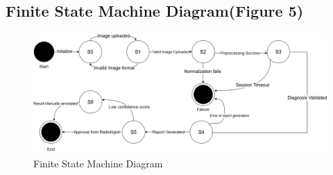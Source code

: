 \documentclass[12pt]{article}
\begin{document}
\subsection{Finite State Machine Diagram(Figure 5)}
\begin{figure}[H]
    \centering
    \includegraphics[width=1\linewidth]{statem.png}
    \caption{Finite State Machine Diagram}
    \label{fig:finite state machine}
\end{figure}

\newpage
\end{document}
